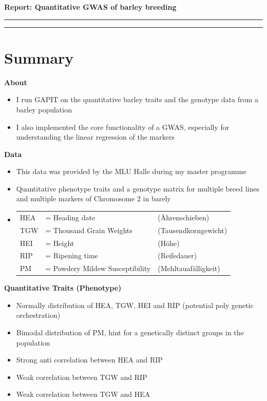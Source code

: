 \documentclass{article}
\def\spacing{\itemsep 0.0cm}
\begin{document}
	\begin{center}
		\LARGE
		\textbf{Report: Quantitative GWAS of barley breeding} \vspace{0.5cm}
		\hrule
	\end{center}
	\tableofcontents
	\bigskip\bigskip\hrule
	
	\section{Summary}
		
		\textbf{About}
		\begin{itemize}\spacing
			\item I run GAPIT on the quantitative barley traits and the genotype data from a barley population
			\item I also implemented the core functionality of a GWAS, especially for understanding the linear regression of the markers
		\end{itemize}
		
		\textbf{Data}
		\begin{itemize}\spacing
			\item This data was provided by the MLU Halle during my master programme 
			\item Quantitative phenotype traits and a genotype matrix for multiple breed lines and multiple markers of Chromosome 2 in barely
			\item[] \begin{tabular}{lll}
					HEA &= Heading date                		&(Ährenschieben) \\
					TGW &= Thousand Grain Weights      		&(Tausendkorngewicht) \\
					HEI &= Height                      		&(Höhe) \\
					RIP &= Ripening time               		&(Reifedauer) \\
					PM  &= Powdery Mildew Susceptibility   	&(Mehltauafälligkeit)
					\end{tabular}
		\end{itemize}

		
		\textbf{Quantitative Traits (Phenotype)}
		\begin{itemize}\spacing
			\item Normally distribution of HEA, TGW, HEI and RIP (potential poly genetic orchestration)
			\item Bimodal distribution of PM, hint for a genetically distinct groups in the population 
			\item Strong anti correlation between HEA and RIP
			\item Weak correlation between TGW and RIP
			\item Weak correlation between TGW and HEA
		\end{itemize}
	\newpage	
		
\end{document}
